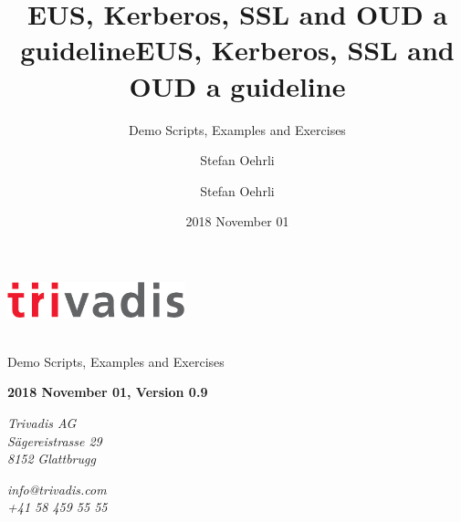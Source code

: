 \documentclass[a4paper,,tablecaptionabove]{scrartcl}
\title{EUS, Kerberos, SSL and OUD a guideline}
\subtitle{Demo Scripts, Examples and Exercises}
\author{Stefan Oehrli}
\date{2018 November 01}
\title{EUS, Kerberos, SSL and OUD a guideline}
\author{Stefan Oehrli}
\begin{document}
  \begin{titlepage}
  
  \begin{flushleft}
  \end{flushleft}

      \begin{flushright}
      \includegraphics[width=5.12cm, right]{TVDLogo2019.eps}
    \end{flushright}
  
  \begin{flushright}
    \vfill
    \\
        \bigskip
    {\Large \textsf{Demo Scripts, Examples and Exercises}}\\
    
    \bigskip

    \begin{flushright}
      \textbf{ 
        2018 November 01,
        Version 0.9 }\\
    \end{flushright}
    \vfill
  \end{flushright}

  \begin{flushright}
     \textit{Trivadis AG\\} 
     \textit{Sägereistrasse 29\\} 
     \textit{8152} 
     \textit{Glattbrugg} 
    \par
  \end{flushright}

  \begin{flushright}
    
    
     \textit{info@trivadis.com\\} 
     \textit{+41 58 459 55 55\\} 
  \end{flushright}
  \end{titlepage}
\end{document}
